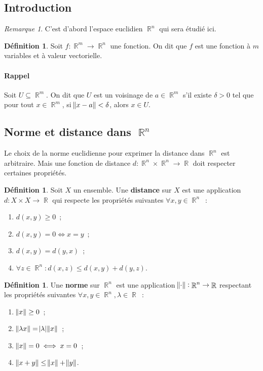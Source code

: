 \documentclass{article}
\DeclareMathOperator{\R}{\mathbb R}
\theoremstyle{definition}
\newtheorem{déf}[thm]{Définition}
\theoremstyle{remark}
\newtheorem*{rmq}{Remarque}
\begin{document}
	\subsection{Introduction}
		\begin{rmq} C'est d'abord l'espace euclidien $\R^n$ qui sera étudié ici. \end{rmq}

		\begin{déf} Soit $f : \R^m \to \R^n$ une fonction. On dit que $f$ est une fonction à $m$ variables et à valeur vectorielle. \end{déf}

		\paragraph{Rappel} Soit $U \subseteq \R^m$. On dit que $U$ est un voisinage de $a \in \R^m$ s'il existe $\delta > 0$ tel que pour tout $x \in \R^m$,
		si $\norm{x-a} < \delta$, alors $x \in U$.

	\subsection{Norme et distance dans $\R^n$}
		Le choix de la norme euclidienne pour exprimer la distance dans $\R^n$ est arbitraire. Mais une fonction de distance $d : \R^n \times \R^n \to \R$ doit
		respecter certaines propriétés.

		\begin{déf} Soit $X$ un ensemble. Une \textbf{distance} sur $X$ est une application $d : X \times X \to \R$ qui respecte les propriétés suivantes
		$\forall x, y \in \R^n$~:

		\begin{enumerate}
			\item $d(x, y) \geq 0$~;
			\item $d(x, y) = 0 \iff x = y$~;
			\item $d(x, y) = d(y, x)$~;
			\item $\forall z \in \R^n : d(x, z) \leq d(x, y) + d(y, z)$.
		\end{enumerate}
		\end{déf}

		\begin{déf} Une \textbf{norme} sur $\R^n$ est une application $\norm \cdot : \R^n \to \R$ respectant les propriétés suivantes
		$\forall x, y \in \R^n, \lambda \in \R$~:

		\begin{enumerate}
			\item $\norm x \geq 0$~;
			\item $\norm {\lambda x} = \abs \lambda \norm x$~;
			\item $\norm x = 0 \iff x = 0$~;
			\item $\norm {x+y} \leq \norm x + \norm y$.
		\end{enumerate}
		\end{déf}
\end{document}
